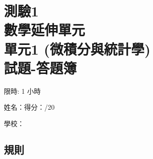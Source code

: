 \documentclass[12pt]{article}
\begin{document}
    \thispagestyle{empty}

    \centering 

    \section*{測驗1\\數學延伸單元\\單元1 (微積分與統計學)\\試題-答題簿}

    限時: 1 小時

    姓名：\hrulefill \hfill 得分：\hrulefill/20

    學校：\hrulefill

    \raggedright

    \subsection*{規則}
\end{document}

